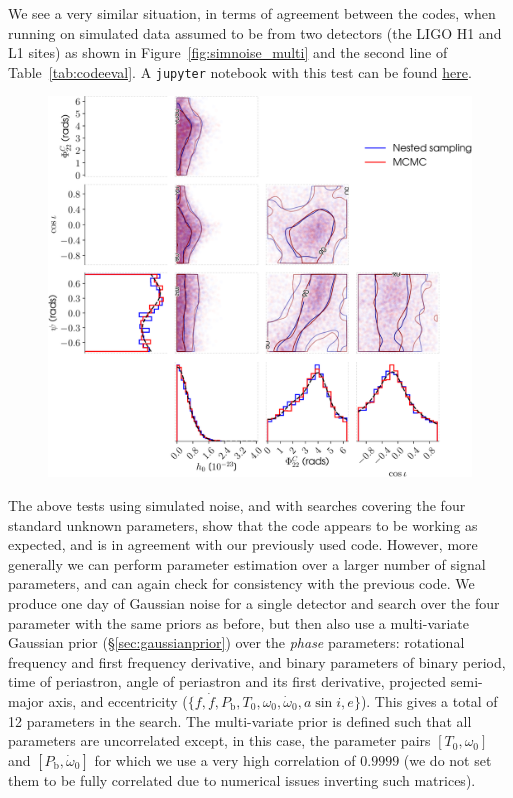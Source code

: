 We see a very similar situation, in terms of agreement between the codes, when running on simulated data assumed to be from two detectors (the LIGO
H1 and L1 sites) as shown in Figure~\ref{fig:simnoise_multi} and the second line of Table~\ref{tab:codeeval}. A {\tt jupyter} notebook with this test
can be found \href{https://github.com/mattpitkin/CW_nested_sampling_doc/blob/master/figures/codeeval/simulations/noise_multidet/SimulatedNoiseTestsMultidetPaper.ipynb}{here}.

\begin{figure}[!phtb]
\begin{center}
\includegraphics[width=1\columnwidth]{./figures/codeeval/simulations/noise_multidet/simulatednoisemultidettest}
\caption{ \protect}
\end{center}
\end{figure}

The above tests using simulated noise, and with searches covering the four standard unknown \gw parameters, show that the code appears to
be working as expected, and is in agreement with our previously used code. However, more generally we can perform parameter estimation
over a larger number of signal parameters, and can again check for consistency with the previous code. We produce one day of Gaussian
noise for a single detector and search over the four \gw parameter with the same priors as before, but then also use a multi-variate Gaussian prior (\S\ref{sec:gaussianprior})
over the {\it phase} parameters: rotational frequency and first frequency derivative, and binary parameters of binary period, time of periastron, angle of
periastron and its first derivative, projected semi-major axis, and eccentricity ($\{f,\dot{f},P_{\text{b}}, T_0, \omega_0, \dot{\omega}_0, a\sin{i}, e\}$).
This gives a total of 12 parameters in the search. The multi-variate prior is defined such that all parameters are uncorrelated except, in this case,
the parameter pairs $[T_0, \omega_0]$ and $[P_{\text{b}}, \dot{\omega}_0]$ for which we use a very high correlation of $0.9999$ (we do not set them to
be fully correlated due to numerical issues inverting such matrices).

